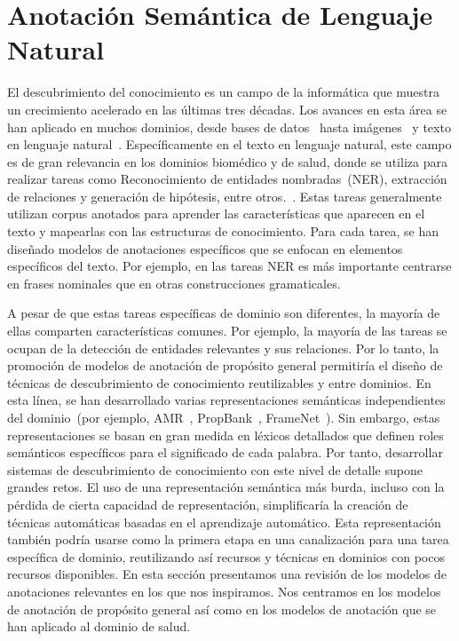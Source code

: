 \section{Anotación Semántica de Lenguaje Natural}\label{sec:sota-annotation}

El descubrimiento del conocimiento es un campo de la informática que muestra un crecimiento acelerado en las últimas tres décadas.
Los avances en esta área se han aplicado en muchos dominios, desde bases de datos~\cite{fayyad1996data, knowledgeDatabase} hasta imágenes~\cite{lu2016visual} y texto en lenguaje natural~\cite{carlson2010toward}.
Específicamente en el texto en lenguaje natural, este campo es de gran relevancia en los dominios biomédico y de salud, donde se utiliza para realizar tareas como
Reconocimiento de entidades nombradas~(NER), extracción de relaciones y generación de hipótesis, entre otros.~\cite{simpson2012biomedical}.
Estas tareas generalmente utilizan corpus anotados para aprender las características que aparecen en el texto y mapearlas con las estructuras de conocimiento.
Para cada tarea, se han diseñado modelos de anotaciones específicos que se enfocan en elementos específicos del texto.
Por ejemplo, en las tareas NER es más importante centrarse en frases nominales que en otras construcciones gramaticales.

A pesar de que estas tareas específicas de dominio son diferentes, la mayoría de ellas comparten características comunes. Por ejemplo, la mayoría de las tareas se ocupan de la detección de entidades relevantes y sus relaciones. Por lo tanto, la promoción de modelos de anotación de propósito general permitiría el diseño de técnicas de descubrimiento de conocimiento reutilizables y entre dominios.
En esta línea, se han desarrollado varias representaciones semánticas independientes del dominio~(por ejemplo, AMR~\cite{amr}, PropBank~\cite{propbank}, FrameNet~\cite{framenet}).
Sin embargo, estas representaciones se basan en gran medida en léxicos detallados que definen roles semánticos específicos para el significado de cada palabra. Por tanto, desarrollar sistemas de descubrimiento de conocimiento con este nivel de detalle supone grandes retos. El uso de una representación semántica más burda, incluso con la pérdida de cierta capacidad de representación, simplificaría la creación de técnicas automáticas basadas en el aprendizaje automático.
Esta representación también podría usarse como la primera etapa en una canalización para una tarea específica de dominio, reutilizando así recursos y técnicas en dominios con pocos recursos disponibles.
En esta sección presentamos una revisión de los modelos de anotaciones relevantes en los que nos inspiramos.
Nos centramos en los modelos de anotación de propósito general así como en los modelos de anotación que se han aplicado al dominio de salud.

